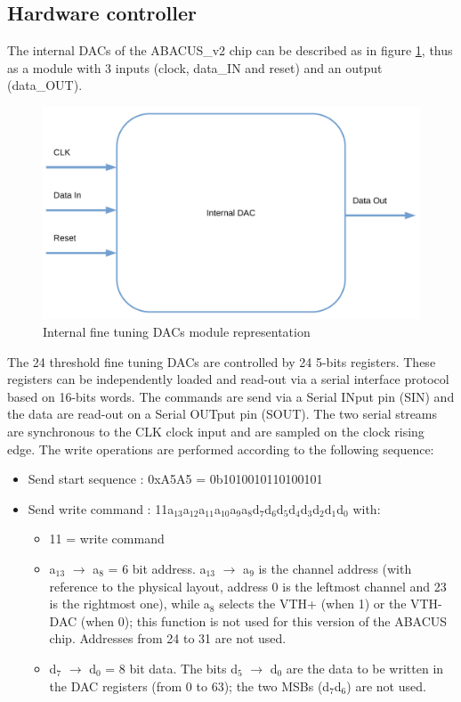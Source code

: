 \subsection{Hardware controller}\label{InternalDac}
\noindent The internal DACs of the ABACUS\_v2 chip can be described as in figure \ref{fig:internaldac}, thus as a module with 3 inputs (clock, data\_IN and reset) and an output (data\_OUT)\cite{dac}.
\begin{figure}[H]
	\centering
	\includegraphics[width=0.4\linewidth]{IMG/ch4/INTERNALDAC}
	\caption{Internal fine tuning DACs module representation}
	\label{fig:internaldac}
\end{figure}
\noindent The 24 threshold fine tuning DACs are controlled by 24 5-bits registers. These registers can be independently
loaded and read-out via a serial interface protocol based on 16-bits words. The commands are send via a Serial
INput pin (SIN) and the data are read-out on a Serial OUTput pin (SOUT). The two serial streams are
synchronous to the CLK clock input and are sampled on the clock rising edge.
\newline
The write operations are performed according to the following sequence:
\begin{itemize}
	\item Send start sequence : 0xA5A5 = 0b1010010110100101
	\item Send write command : 11a$_{13}$a$_{12}$a$_{11}$a$_{10}$a$_{9}$a$_{8}$d$_{7}$d$_{6}$d$_{5}$d$_{4}$d$_{3}$d$_{2}$d$_{1}$d$_{0}$ with:
	\begin{itemize}
		\item 11 = write command
		\item a$_{13}$ $\rightarrow$ a$_{8}$ = 6 bit address. a$_{13}$ $\rightarrow$ a$_{9}$ is the channel address (with reference to the physical layout, address 0 is the leftmost channel and 23 is the rightmost one), while a$_{8}$ selects the VTH+ (when 1) or the VTH- DAC (when 0); this function is not used for this version of the ABACUS chip. Addresses from 24 to 31 are not used.
		\item d$_{7}$ $\rightarrow$ d$_{0}$ = 8 bit data. The bits d$_{5}$ $\rightarrow$ d$_{0}$ are the data to be written in the DAC registers (from 0 to 63); the two MSBs (d$_{7}$d$_{6}$) are not used.
	\end{itemize}
\end{itemize}
